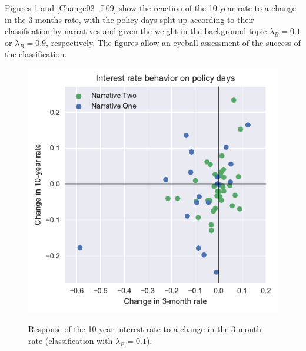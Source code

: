 \documentclass[11pt,a4paper,english,oneside]{book}
\numberwithin{equation}{chapter}
\begin{document}
Figures \ref{Change02_L01} and \ref{Change02_L09} show the reaction of the 10-year rate to a change in the 3-months rate, with the policy days split up according to their classification by narratives and given the weight in the background topic $\lambda_B=0.1$ or $\lambda_B=0.9$, respectively. The figures allow an eyeball assessment of the success of the classification. 

\begin{figure}
	\caption{Response of the 10-year interest rate to a change in the 3-month rate (classification with $\lambda_B=0.1$).}
	\centering
	\includegraphics[scale=1]{Images/ChangePlot_L0_1.pdf}
	\label{Change02_L01}
\end{figure}
\end{document}
